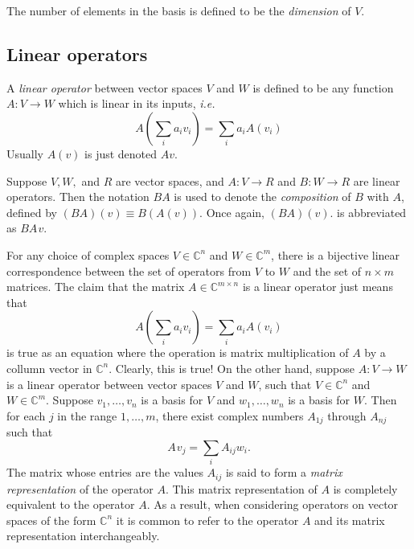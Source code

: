 \begin{definition}
The number of elements in the basis is defined to be the \emph{dimension}  of
$V$.
\end{definition}

\subsection{Linear operators}
A \emph{linear operator} between vector spaces $V$ and $W$ is defined to be any function $A : V \rightarrow W$ which is linear in its inputs, \textit{i.e.}
\begin{equation*}
  A \left( \sum_{i} a_{i} v_{i} \right) = \sum_{i} a_i A (v_{i})
\end{equation*}
Usually $A(v)$ is just denoted $A v$.

Suppose $V, W,$ and $R$ are vector spaces, and $A : V \rightarrow R$ and $B : W \rightarrow R$ are linear operators. Then the notation $BA$ is used  to denote the \emph{composition} of $B$ with $A$,
defined by $(BA)(v) \equiv B(A(v))$. Once again, $(BA)(v)$. is abbreviated as  $BA \hspace{1pt}v$.

For any choice of complex spaces $V \in \mathbb{C}^n $ and $W \in \mathbb{C}^m$, there is a bijective linear correspondence between the set of operators from $V$ to $W$ and the set of $n \times m$ matrices. %
The claim that the matrix $A \in \mathbb{C}^{m\times n}$ is a linear operator just means that
\begin{equation*}
  A \left( \sum_{i} a_{i} v_{i} \right) = \sum_{i} a_i A (v_{i})
\end{equation*}
is true as an equation where the operation is matrix multiplication of $A$ by a collumn vector in $\mathbb{C}^n$. Clearly, this is true! On the other hand, suppose $A : V \rightarrow W$ is a linear operator between vector spaces $V$ and $W$, such that $V \in \mathbb{C}^n $ and $W \in \mathbb{C}^m$. Suppose $v_1,\ldots, v_n$ is a basis for $V$ and $w_1,\ldots,w_n $ is a
basis for $W$. Then for each $j$ in the range $1, \ldots ,m$, there exist complex numbers $A_{1j}$ through $A_{nj}$ such that
\begin{equation*}
  A \hspace{1pt} v_j = \sum_{i} A_{ij} w_i.
\end{equation*}
The matrix whose entries are the values $A_{ij}$ is said to form a \emph{matrix representation} of the operator $A$. This matrix representation of $A$ is completely equivalent to the operator $A$. As a result, when considering operators on vector spaces of the form $\mathbb{C}^n$ it is common to refer to the operator $A$ and its matrix representation interchangeably.

